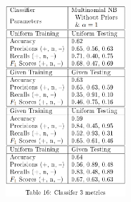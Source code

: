 \documentclass[11pt]{article}
\begin{document}
\begin{figure}[H]
	\centering
	\includegraphics[width = 0.4\textwidth]{c3m.png}
	\label{tbl:metrics-3rd10000}
\end{figure} 





\end{document}
